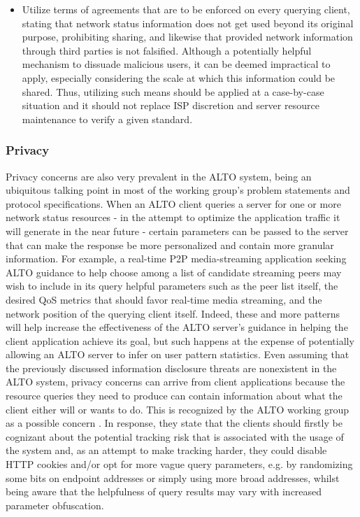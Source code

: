 \begin{itemize}
    \item Utilize terms of agreements that are to be enforced on every querying client, stating that network status information does not get used beyond its original purpose, prohibiting sharing, and likewise that provided network information through third parties is not falsified.
        Although a potentially helpful mechanism to dissuade malicious users, it can be deemed impractical to apply, especially considering the scale at which this information could be shared.
        Thus, utilizing such means should be applied at a case-by-case situation and it should not replace ISP discretion and server resource maintenance to verify a given standard.
\end{itemize}

\subsubsection{Privacy}%

    Privacy concerns are also very prevalent in the ALTO system, being an ubiquitous talking point in most of the working group's problem statements and protocol specifications.
    When an ALTO client queries a server for one or more network status resources - in the attempt to optimize the application traffic it will generate in the near future - certain parameters can be passed to the server that can make the response be more personalized and contain more granular information.
    For example, a real-time P2P media-streaming application seeking ALTO guidance to help choose among a list of candidate streaming peers may wish to include in its query helpful parameters such as the peer list itself, the desired QoS metrics that should favor real-time media streaming, and the network position of the querying client itself.
    Indeed, these and more patterns will help increase the effectiveness of the ALTO server's guidance in helping the client application achieve its goal, but such happens at the expense of potentially allowing an ALTO server to infer on user pattern statistics.
    Even assuming that the previously discussed information disclosure threats are nonexistent in the ALTO system, privacy concerns can arrive from client applications because the resource queries they need to produce can contain information about what the client either will or wants to do.
    This is recognized by the ALTO working group as a possible concern \cite{alto-protocol} \cite{alto-problem-statement}.
    In response, they state that the clients should firstly be cognizant about the potential tracking risk that is associated with the usage of the system and, as an attempt to make tracking harder, they could disable HTTP cookies and/or opt for more vague query parameters, e.g. by randomizing some bits on endpoint addresses or simply using more broad addresses, whilst being aware that the helpfulness of query results may vary with increased parameter obfuscation.

